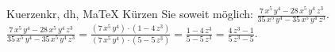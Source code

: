 \begin{MAufgabe}{Kuerzen}{kr, dh, MaTeX}
K\"urzen Sie soweit m\"oglich: $\frac{7\, x^5\, y^4 - 28\, x^5\, y^4\, z^3}{35\, x^5\, y^4 - 35\, x^5\, y^4\, z^3}$.\\ 
\ifLsg\MLoesung
\quad $\frac{7\, x^5\, y^4 - 28\, x^5\, y^4\, z^3}{35\, x^5\, y^4 - 35\, x^5\, y^4\, z^3}=\frac{(7\, x^5\, y^4)\cdot(1 - 4\, z^3)}{(7\, x^5\, y^4)\cdot(5 - 5\, z^3)}=\frac{1 - 4\, z^3}{5 - 5\, z^3}=\frac{4\, z^3 - 1}{5\, z^3 - 5}$.\else\relax\fi
 \end{MAufgabe}
